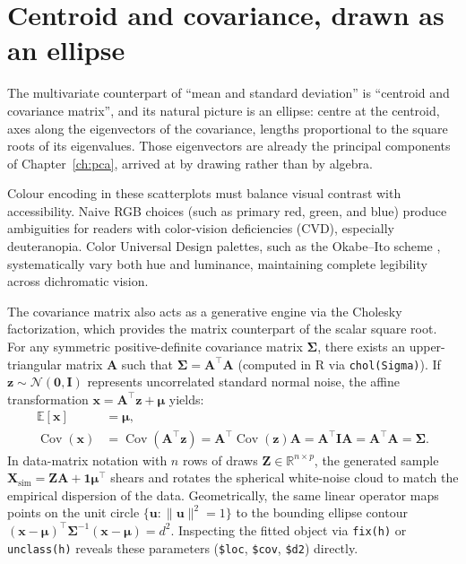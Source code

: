 \documentclass[11pt,oneside]{book}
\newcommand{\code}[1]{\texttt{#1}}
\begin{document}
\section{Centroid and covariance, drawn as an ellipse}
The multivariate counterpart of ``mean and standard deviation'' is ``centroid and
covariance matrix'', and its natural picture is an ellipse: centre at the centroid, axes
along the eigenvectors of the covariance, lengths proportional to the square roots of its
eigenvalues. Those eigenvectors are already the principal components of
Chapter~\ref{ch:pca}, arrived at by drawing rather than by algebra.

Colour encoding in these scatterplots must balance visual contrast with accessibility.
Naive RGB choices (such as primary red, green, and blue) produce ambiguities for readers
with color-vision deficiencies (CVD), especially deuteranopia. Color Universal Design
palettes, such as the Okabe--Ito scheme \cite{Wong_2011}, systematically vary both hue
and luminance, maintaining complete legibility across dichromatic vision.

The covariance matrix also acts as a generative engine via the Cholesky factorization,
which provides the matrix counterpart of the scalar square root. For any symmetric
positive-definite covariance matrix $\mathbf{\Sigma}$, there exists an upper-triangular
matrix $\mathbf{A}$ such that $\mathbf{\Sigma} = \mathbf{A}^{\!\top}\mathbf{A}$ (computed
in R via \code{chol(Sigma)}). If $\mathbf{z} \sim \mathcal{N}(\mathbf{0}, \mathbf{I})$
represents uncorrelated standard normal noise, the affine transformation
$\mathbf{x} = \mathbf{A}^{\!\top}\mathbf{z} + \boldsymbol{\mu}$ yields:
\begin{align}
  \mathbb{E}[\mathbf{x}] &= \boldsymbol{\mu}, \\
  \operatorname{Cov}(\mathbf{x}) &= \operatorname{Cov}(\mathbf{A}^{\!\top}\mathbf{z})
  = \mathbf{A}^{\!\top}\operatorname{Cov}(\mathbf{z})\mathbf{A}
  = \mathbf{A}^{\!\top}\mathbf{I}\mathbf{A}
  = \mathbf{A}^{\!\top}\mathbf{A} = \mathbf{\Sigma}.
\end{align}
In data-matrix notation with $n$ rows of draws $\mathbf{Z} \in \mathbb{R}^{n \times p}$,
the generated sample $\mathbf{X}_{\text{sim}} = \mathbf{Z}\mathbf{A} + \mathbf{1}\boldsymbol{\mu}^{\!\top}$
shears and rotates the spherical white-noise cloud to match the empirical dispersion of the
data. Geometrically, the same linear operator maps points on the unit circle
$\{\mathbf{u} : \|\mathbf{u}\|^2 = 1\}$ to the bounding ellipse contour
$(\mathbf{x} - \boldsymbol{\mu})^{\!\top} \mathbf{\Sigma}^{-1} (\mathbf{x} - \boldsymbol{\mu}) = d^2$.
Inspecting the fitted object via \code{fix(h)} or \code{unclass(h)} reveals these parameters
(\code{\$loc}, \code{\$cov}, \code{\$d2}) directly.
\end{document}
